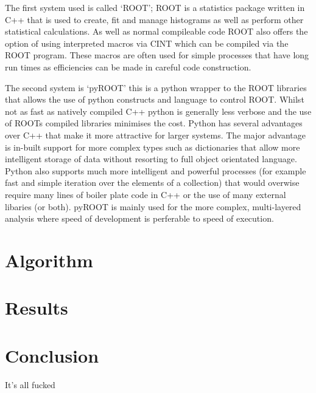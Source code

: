 \documentclass[]{article}
\begin{document}
The first system used is called `ROOT'; ROOT is a statistics package written in C++ that is used to create, fit and manage histograms as well as perform other statistical calculations. As well as normal compileable code ROOT also offers the option of using interpreted macros via CINT which can be compiled via the ROOT program. These macros are often used for simple processes that have long run times as efficiencies can be made in careful code construction.

The second system is `pyROOT' this is a python wrapper to the ROOT libraries that allows the use of python constructs and language to control ROOT. Whilst not as fast as natively compiled C++ python is generally less verbose and the use of ROOTs compiled libraries minimises the cost. Python has several advantages over C++ that make it more attractive for larger systems. The major advantage is in-built support for more complex types such as dictionaries that allow more intelligent storage of data without resorting to full object orientated language. Python also supports much more intelligent and powerful processes (for example fast and simple iteration over the elements of a collection) that would overwise require many lines of boiler plate code in C++ or the use of many external libaries (or both). pyROOT is mainly used for the more complex, multi-layered analysis where speed of development is perferable to speed of execution.

\section{Algorithm}\label{sec:algorithm}
\section{Results}\label{sec:results}
\section{Conclusion}\label{sec:conclusion}
It's all fucked



\end{document}
